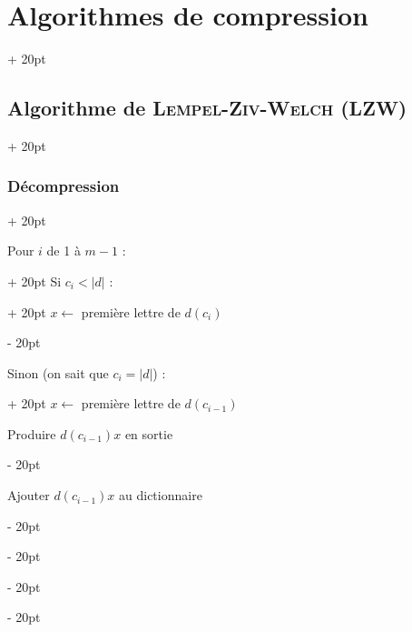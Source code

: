\documentclass[a4paper, 12pt, twoside]{article}
\newcommand{\abs}[1]{\left\lvert #1 \right\rvert}
\newcommand{\ind}[1][20pt]{\advance\leftskip + #1}
\newcommand{\deind}[1][20pt]{\advance\leftskip - #1}
\newenvironment{indt}[2][20pt]{#2 \par \ind[#1]}{\par \deind} %
\begin{document}
\begin{indt}{\section{Algorithmes de compression}}
\begin{indt}{\subsection{Algorithme de \textsc{Lempel-Ziv-Welch} (LZW)}}
\begin{indt}{\subsubsection{Décompression}}
\begin{pseudocode}
\begin{indt}{Pour $i$ de 1 à $m - 1$ :}
\begin{indt}{Si $c_i < \abs d$ :}
                            $x \leftarrow$ première lettre de $d(c_i)$
                        \end{indt}

                        \vspace{6pt}
                        
                        \begin{indt}{Sinon (on sait que $c_i = \abs d$) :}
                            $x \leftarrow$ première lettre de $d(c_{i - 1})$

                            Produire $d(c_{i - 1}) x$ en sortie
                        \end{indt}

                        \vspace{6pt}
                        
                        Ajouter $d(c_{i - 1})x$ au dictionnaire
                    \end{indt}
                \end{pseudocode}
            \end{indt}
        \end{indt}
    \end{indt}
    
    
    
\end{document}
